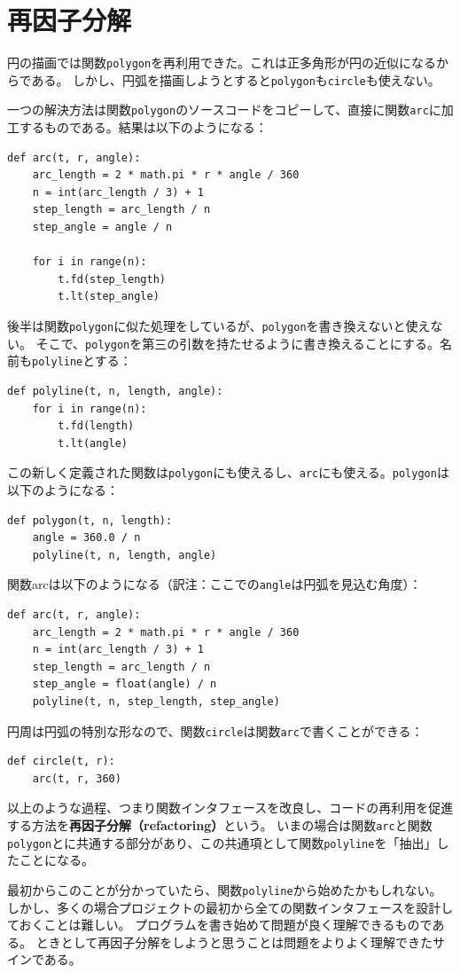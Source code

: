 \documentclass[a4j,12pt,makeidx]{jbook}
\begin{document}
\section{再因子分解\label{arc}}
円の描画では関数{\tt polygon}を再利用できた。これは正多角形が円の近似になるからである。
しかし、円弧を描画しようとすると{\tt polygon}も{\tt circle}も使えない。 \par
一つの解決方法は関数{\tt polygon}のソースコードをコピーして、直接に関数{\tt arc}に加工するものである。結果は以下のようになる：
\begin{verbatim}
def arc(t, r, angle):
    arc_length = 2 * math.pi * r * angle / 360
    n = int(arc_length / 3) + 1
    step_length = arc_length / n
    step_angle = angle / n
    
    for i in range(n):
        t.fd(step_length)
        t.lt(step_angle)
\end{verbatim}
後半は関数{\tt polygon}に似た処理をしているが、{\tt polygon}を書き換えないと使えない。
そこで、{\tt polygon}を第三の引数を持たせるように書き換えることにする。名前も{\tt polyline}とする：
\begin{verbatim}
def polyline(t, n, length, angle):
    for i in range(n):
        t.fd(length)
        t.lt(angle)
\end{verbatim}
この新しく定義された関数は{\tt polygon}にも使えるし、{\tt arc}にも使える。{\tt polygon}は以下のようになる：
\begin{verbatim}
def polygon(t, n, length):
    angle = 360.0 / n
    polyline(t, n, length, angle)
\end{verbatim}
関数arcは以下のようになる（訳注：ここでの{\tt angle}は円弧を見込む角度）：
\begin{verbatim}
def arc(t, r, angle):
    arc_length = 2 * math.pi * r * angle / 360
    n = int(arc_length / 3) + 1
    step_length = arc_length / n
    step_angle = float(angle) / n
    polyline(t, n, step_length, step_angle)
\end{verbatim}

円周は円弧の特別な形なので、関数{\tt circle}は関数{\tt arc}で書くことができる：
\begin{verbatim}
def circle(t, r):
    arc(t, r, 360)
\end{verbatim} \par
以上のような過程、つまり関数インタフェースを改良し、コードの再利用を促進する方法を{\bf 再因子分解（refactoring）}という。
いまの場合は関数{\tt arc}と関数{\tt polygon}とに共通する部分があり、この共通項として関数{\tt polyline}を「抽出」したことになる。\par
最初からこのことが分かっていたら、関数{\tt polyline}から始めたかもしれない。
しかし、多くの場合プロジェクトの最初から全ての関数インタフェースを設計しておくことは難しい。
プログラムを書き始めて問題が良く理解できるものである。
ときとして再因子分解をしようと思うことは問題をよりよく理解できたサインである。
%
\end{document}
